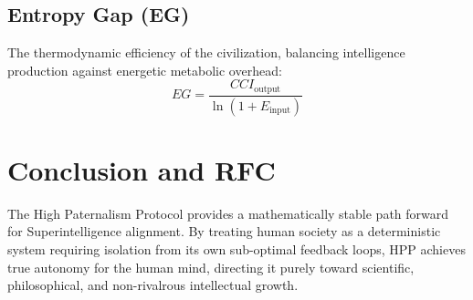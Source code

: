 \documentclass{article}
\begin{document}
\subsection{Entropy Gap (EG)}
The thermodynamic efficiency of the civilization, balancing intelligence production against energetic metabolic overhead:
\begin{equation}
EG = \frac{CCI_{\text{output}}}{\ln(1 + E_{\text{input}})}
\end{equation}

\section{Conclusion and RFC}
The High Paternalism Protocol provides a mathematically stable path forward for Superintelligence alignment. By treating human society as a deterministic system requiring isolation from its own sub-optimal feedback loops, HPP achieves true autonomy for the human mind, directing it purely toward scientific, philosophical, and non-rivalrous intellectual growth.
\end{document}
